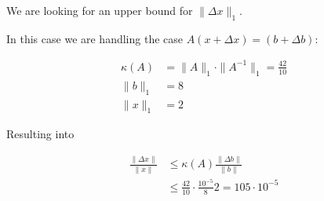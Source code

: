 We are looking for an upper bound for \(\|\Delta x\|_1\).

In this case we are handling the case \(A(x + \Delta x) = (b + \Delta b)\): 

\begin{align*}
    \kappa(A) &= \|A\|_1 \cdot \|A^{-1}\|_1 = \frac{42}{10} \\ 
    \|b\|_1 &= 8 \\
    \|x\|_1 &= 2
\end{align*}

Resulting into 

\begin{align*} 
    \frac{\|\Delta x \|}{\|x\|} &\le \kappa(A) \frac{\|\Delta b \| }{\|b\|} \\
    &\le \frac{42}{10} \cdot \frac{10^{-5}}{8} 2 = 105\cdot 10^{-5}
\end{align*}
